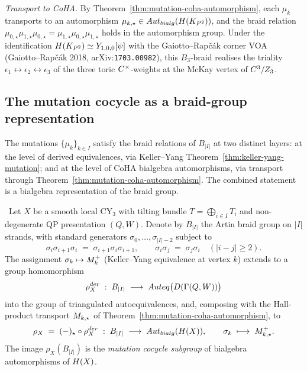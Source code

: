 \begin{example}
\emph{Transport to CoHA.} By
Theorem~\ref{thm:mutation-coha-automorphism}, each $\mu_k$ transports to an
automorphism $\mu_{k, \star} \in Aut_{bialg}(H(K_{P^2}))$,
and the braid relation $\mu_{0,\star} \mu_{1,\star} \mu_{0,\star} =
\mu_{1,\star} \mu_{0,\star} \mu_{1,\star}$ holds in the automorphism group.
Under the identification $H(K_{P^2}) \simeq Y_{1, 0, 0}[\psi]$ with the
Gaiotto--Rap\v{c}\'ak corner VOA (Gaiotto--Rap\v{c}\'ak 2018,
arXiv:\texttt{1703.00982}), this $B_3$-braid realises the triality
$\epsilon_1 \leftrightarrow \epsilon_2 \leftrightarrow \epsilon_3$ of the
three toric $C^\times$-weights at the McKay vertex of $C^3/Z_3$.
\end{example}

\subsection*{The mutation cocycle as a braid-group representation}

The mutations $\{\mu_k\}_{k \in I}$ satisfy the braid relations of $B_{|I|}$
at two distinct layers: at the level of derived equivalences, via Keller--Yang
Theorem~\ref{thm:keller-yang-mutation}; and at the level of CoHA bialgebra
automorphisms, via transport through
Theorem~\ref{thm:mutation-coha-automorphism}. The combined statement is a
bialgebra representation of the braid group.

\begin{theorem}
\label{thm:mutation-cocycle}
\ClaimStatusTheorem\ Let $X$ be a smooth local CY$_3$ with tilting bundle
$T = \bigoplus_{i \in I} T_i$ and non-degenerate QP presentation $(Q, W)$.
Denote by $B_{|I|}$ the Artin braid group on $|I|$ strands, with standard
generators $\sigma_0, \ldots, \sigma_{|I| - 2}$ subject to
\[
  \sigma_i \sigma_{i+1} \sigma_i \;=\; \sigma_{i+1} \sigma_i \sigma_{i+1},
  \qquad
  \sigma_i \sigma_j \;=\; \sigma_j \sigma_i \quad (|i - j| \geq 2).
\]
The assignment $\sigma_k \mapsto M_k^{+}$ (Keller--Yang equivalence at
vertex $k$) extends to a group homomorphism
\[
  \rho_X^{der} \;:\; B_{|I|} \;\longrightarrow\;
  Auteq\bigl(D(\Gamma(Q, W))\bigr)
\]
into the group of triangulated autoequivalences, and, composing with the
Hall-product transport $M_{k,\star}$ of
Theorem~\ref{thm:mutation-coha-automorphism}, to
\[
  \rho_X \;=\; (-)_{\star} \circ \rho_X^{der} \;:\; B_{|I|}
  \;\longrightarrow\; Aut_{bialg}(H(X)),
  \qquad \sigma_k \;\longmapsto\; M_{k,\star}^{+}.
\]
The image $\rho_X(B_{|I|})$ is the \emph{mutation cocycle subgroup} of
bialgebra automorphisms of $H(X)$.
\end{theorem}

